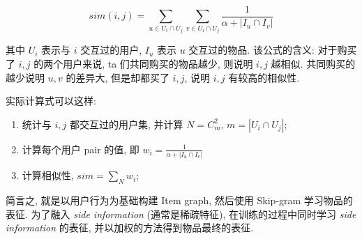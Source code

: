 $$
sim(i, j) = \sum_{u \in U_i \cap U_j} \sum_{v \in U_i \cap U_j} \frac{1}{\alpha + | I_u \cap I_v |}
$$

其中 $U_i$ 表示与 $i$ 交互过的用户, $I_u$ 表示 $u$ 交互过的物品. 该公式的含义: 对于购买了 $i, j$ 的两个用户来说, ta 们共同购买的物品越少, 则说明 $i, j$ 越相似. 共同购买的越少说明 $u, v$ 的差异大, 但是却都买了 $i, j$, 说明 $i, j$ 有较高的相似性.  

实际计算式可以这样:
\begin{enumerate}
	\item 统计与 $i, j$ 都交互过的用户集, 并计算 $N = C_m^2$, $m = |U_i \cap U_j|$;
	
	\item 计算每个用户 pair 的值, 即 $w_i = \frac{1}{\alpha + |I_u \cap I_v|}$
	
	\item 计算相似性, $sim = \sum_N w_i$;
\end{enumerate}

简言之, 就是以用户行为为基础构建 Item graph, 然后使用 Skip-gram 学习物品的表征. 为了融入 \textit{side information} (通常是稀疏特征), 在训练的过程中同时学习 \textit{side information} 的表征, 并以加权的方法得到物品最终的表征. 
